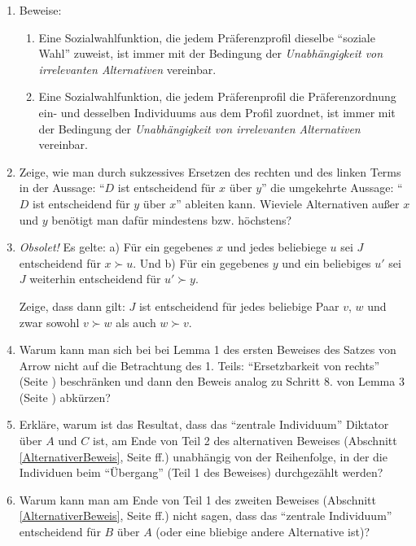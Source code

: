 \begin{enumerate}
  \item \label{AufgArrow2} Beweise:
  \begin{enumerate}
    \item Eine Sozialwahlfunktion, die jedem Präferenzprofil dieselbe
    "`soziale Wahl"' zuweist, ist immer mit der Bedingung der {\em
    Unabhängigkeit von irrelevanten Alternativen} vereinbar.
    \item Eine Sozialwahlfunktion, die jedem Präferenprofil die
    Präferenzordnung ein- und desselben Individuums aus dem Profil zuordnet,
    ist immer mit der Bedingung der {\em Unabhängigkeit von irrelevanten Alternativen} 
    vereinbar.
  \end{enumerate}
 
  \item \label{AufgArrow4} Zeige, wie man durch sukzessives Ersetzen des
  rechten und des linken Terms in der Aussage: "`$D$ ist entscheidend für $x$ über
  $y$"' die umgekehrte Aussage: "`$D$ ist entscheidend für $y$ über $x$"'
  ableiten kann. Wieviele Alternativen außer $x$ und $y$ benötigt man dafür
  mindestens bzw. höchstens? 
  
  \item {\em Obsolet!} Es gelte: a) Für ein gegebenes $x$ und
  jedes beliebiege $u$ sei $J$ entscheidend für $x \succ u$. Und b) Für ein gegebenes
  $y$ und ein beliebiges $u'$ sei $J$ weiterhin entscheidend für $u' \succ y$.
  
  Zeige, dass dann gilt: $J$ ist entscheidend für jedes beliebige Paar $v$, $w$
  und zwar sowohl $v \succ w$ als auch $w \succ v$.
  
  \item Warum kann man sich bei bei Lemma 1 des ersten
  Beweises des Satzes von Arrow nicht auf die Betrachtung des 1. Teils:
  ``Ersetzbarkeit von rechts'' (Seite \pageref{Lemma1ErsetzbarkeitVonRechts})
  beschränken und dann den Beweis analog zu Schritt 8. von Lemma 3 (Seite
  \pageref{Lemma3Schritt8}) abkürzen?
  
  \item Erkläre, warum ist das Resultat, dass das "`zentrale Individuum"' 
  Diktator über $A$ und $C$ ist, am Ende von Teil 2 des alternativen Beweises
  (Abschnitt \ref{AlternativerBeweis}, Seite \pageref{AlternativerBeweis}ff.) 
  unabhängig von der Reihenfolge, in der die
  Individuen beim "`Übergang"' (Teil 1 des Beweises) durchgezählt werden?
  
  \item Warum kann man am Ende von Teil 1 des zweiten Beweises (Abschnitt
  \ref{AlternativerBeweis}, Seite \pageref{AlternativerBeweis}ff.) nicht sagen,
  dass das "`zentrale Individuum"' entscheidend für $B$
  über $A$ (oder eine bliebige andere Alternative ist)? 
  

\end{enumerate}
